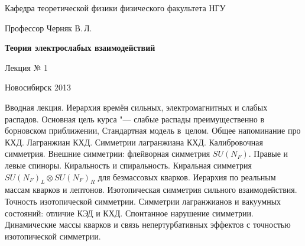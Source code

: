 \documentclass[12pt,pagesize,paper=192mm:108mm]{scrbook}
\begin{document}
\begin{titlepage}
\begin{center}
    Кафедра теоретической физики физического факультета НГУ
    \medskip

    \Large
    Профессор Черняк В.\,Л.
    \bigskip

    \huge
    \textbf{Теория электрослабых взаимодействий}
    \bigskip

    \Large
    Лекция № 1
    \vfill

    \vfill

\normalsize    Новосибирск 2013
  \smallskip

  \ccbysa
  \end{center}
\end{titlepage}
\newpage

\vspace*{-1em}
\begin{center}
 \vfill
  \begin{minipage}{0.66\linewidth}
    Вводная лекция. Иерархия времён сильных, электромагнитных и слабых
    распадов. Основная цель курса "--- слабые распады преимущественно в
    борновском приближении, Стандартная модель в~целом.  Общее
    напоминание про КХД. Лагранжиан КХД. Симметрии лагранжиана
    КХД. Калибровочная симметрия. Внешние симметрии: флейворная
    симметрия $SU(N_F)$. Правые и левые
    спиноры.  Киральность и спиральность. Киральная симметрия
    $SU(N_F)_L\otimes SU(N_F)_R$ для
    безмассовых кварков.  Иерархия по реальным массам кварков и
    лептонов. Изотопическая симметрия сильного взаимодействия.
    Точность изотопической симметрии. Симметрии лагранжианов и
    вакуумных состояний: отличие КЭД и КХД.  Спонтанное нарушение
    симметрии. Динамические массы кварков и связь непертурбативных
    эффектов с точностью изотопической симметрии.
  \end{minipage}
  \vfill

\end{center}
\end{document}
